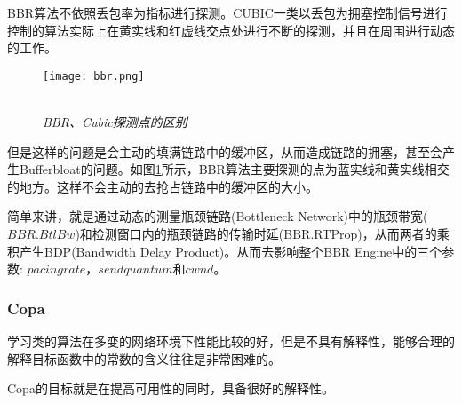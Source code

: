 \documentclass[a4paper, 12pt, UTF8]{ctexart}
\begin{document}
\par BBR算法不依照丢包率为指标进行探测。CUBIC一类以丢包为拥塞控制信号进行控制的算法实际上在黄实线和红虚线交点处进行不断的探测，并且在周围进行动态的工作。

\begin{figure}[H]
	\centering \texttt{[image: bbr.png]}
	\\ \hspace*{\fill} \\
	\caption{\em BBR、Cubic探测点的区别}
	\label{fig:BBR algorithm}
\end{figure}
\par 但是这样的问题是会主动的填满链路中的缓冲区，从而造成链路的拥塞，甚至会产生Bufferbloat的问题。如图\ref{fig:BBR algorithm}所示，BBR算法主要探测的点为蓝实线和黄实线相交的地方。这样不会主动的去抢占链路中的缓冲区的大小。

\par 简单来讲，就是通过动态的测量瓶颈链路(Bottleneck Network)中的瓶颈带宽($BBR.BtlBw$)和检测窗口内的瓶颈链路的传输时延(BBR.RTProp)，从而两者的乘积产生BDP(Bandwidth Delay Product)。从而去影响整个BBR Engine中的三个参数: $pacing rate$，$send quantum$和$cwnd$。



\subsubsection{Copa}

\par 学习类的算法在多变的网络环境下性能比较的好，但是不具有解释性\cite{DongMZAGGS18}，能够合理的解释目标函数中的常数的含义往往是非常困难的。


\par Copa\cite{DBLP:conf/nsdi/ArunB18}的目标就是在提高可用性的同时，具备很好的解释性。
\end{document}
